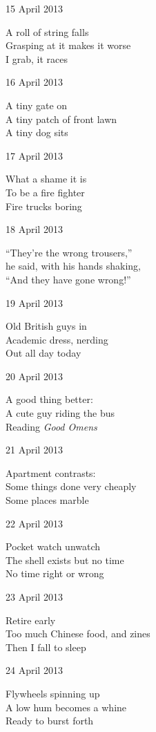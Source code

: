 \documentclass[12pt]{article}
\begin{document}
15 April 2013

A roll of string falls \\
Grasping at it makes it worse \\
I grab, it races

16 April 2013

A tiny gate on \\
A tiny patch of front lawn \\
A tiny dog sits

\newpage

17 April 2013

What a shame it is \\
To be a fire fighter \\
Fire trucks boring

18 April 2013

``They're the wrong trousers,'' \\
he said, with his hands shaking, \\
``And they have gone wrong!''

19 April 2013

Old British guys in \\
Academic dress, nerding \\
Out all day today

20 April 2013

A good thing better: \\
A cute guy riding the bus \\
Reading {\em Good Omens}

21 April 2013

Apartment contrasts: \\
Some things done very cheaply \\
Some places marble

22 April 2013

Pocket watch unwatch \\
The shell exists but no time \\
No time right or wrong

23 April 2013

Retire early \\
Too much Chinese food, and zines \\
Then I fall to sleep

\newpage

24 April 2013

Flywheels spinning up \\
A low hum becomes a whine \\
Ready to burst forth
\end{document}
